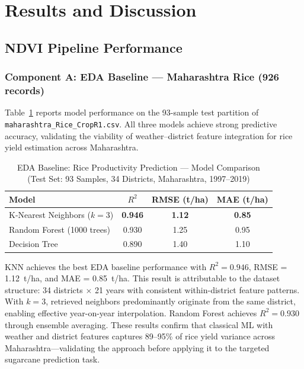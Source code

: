 \documentclass[conference]{IEEEtran}
\begin{document}
\section{Results and Discussion}

\subsection{NDVI Pipeline Performance}

\subsubsection{Component A: EDA Baseline --- Maharashtra Rice (926 records)}

Table~\ref{tab:ndvi} reports model performance on the 93-sample test partition
of \texttt{maharashtra\_Rice\_CropR1.csv}. All three models achieve strong
predictive accuracy, validating the viability of weather--district feature
integration for rice yield estimation across Maharashtra.

\begin{table}[htbp]
\caption{EDA Baseline: Rice Productivity Prediction --- Model Comparison\\
(Test Set: 93 Samples, 34 Districts, Maharashtra, 1997--2019)}
\label{tab:ndvi}
\centering
\renewcommand{\arraystretch}{1.15}
\begin{tabular}{@{}lccc@{}}
\toprule
\textbf{Model} & \textbf{$R^2$} & \textbf{RMSE (t/ha)} & \textbf{MAE (t/ha)} \\
\midrule
K-Nearest Neighbors ($k=3$) & \textbf{0.946} & \textbf{1.12} & \textbf{0.85} \\
Random Forest (1000 trees)  & 0.930          & 1.25          & 0.95          \\
Decision Tree               & 0.890          & 1.40          & 1.10          \\
\bottomrule
\end{tabular}
\end{table}

KNN achieves the best EDA baseline performance with $R^2 = 0.946$,
RMSE = \SI{1.12}{\tonne/\hectare}, and MAE = \SI{0.85}{\tonne/\hectare}.
This result is attributable to the dataset structure: 34 districts $\times$
21 years with consistent within-district feature patterns. With $k = 3$,
retrieved neighbors predominantly originate from the same district, enabling
effective year-on-year interpolation. Random Forest achieves $R^2 = 0.930$
through ensemble averaging. These results confirm that classical ML with
weather and district features captures 89--95\% of rice yield variance across
Maharashtra---validating the approach before applying it to the targeted
sugarcane prediction task.
\end{document}
